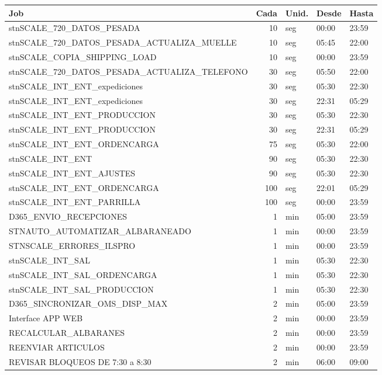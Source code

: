 \documentclass[11pt,a4paper]{article}
\begin{document}
\begin{longtable}{p{8.6cm}rp{1.3cm}p{1.6cm}p{1.6cm}}
\toprule
\textbf{Job} & \textbf{Cada} & \textbf{Unid.} & \textbf{Desde} & \textbf{Hasta} \\
\midrule
\endhead
stnSCALE\_720\_DATOS\_PESADA & 10 & seg & 00:00 & 23:59 \\
stnSCALE\_720\_DATOS\_PESADA\_ACTUALIZA\_MUELLE & 10 & seg & 05:45 & 22:00 \\
stnSCALE\_COPIA\_SHIPPING\_LOAD & 10 & seg & 00:00 & 23:59 \\
stnSCALE\_720\_DATOS\_PESADA\_ACTUALIZA\_TELEFONO & 30 & seg & 05:50 & 22:00 \\
stnSCALE\_INT\_ENT\_expediciones & 30 & seg & 05:30 & 22:30 \\
stnSCALE\_INT\_ENT\_expediciones & 30 & seg & 22:31 & 05:29 \\
stnSCALE\_INT\_ENT\_PRODUCCION & 30 & seg & 05:30 & 22:30 \\
stnSCALE\_INT\_ENT\_PRODUCCION & 30 & seg & 22:31 & 05:29 \\
stnSCALE\_INT\_ENT\_ORDENCARGA & 75 & seg & 05:30 & 22:00 \\
stnSCALE\_INT\_ENT & 90 & seg & 05:30 & 22:30 \\
stnSCALE\_INT\_ENT\_AJUSTES & 90 & seg & 05:30 & 22:30 \\
stnSCALE\_INT\_ENT\_ORDENCARGA & 100 & seg & 22:01 & 05:29 \\
stnSCALE\_INT\_ENT\_PARRILLA & 100 & seg & 00:00 & 23:59 \\
\midrule
D365\_ENVIO\_RECEPCIONES & 1 & min & 05:00 & 23:59 \\
STNAUTO\_AUTOMATIZAR\_ALBARANEADO & 1 & min & 00:00 & 23:59 \\
STNSCALE\_ERRORES\_ILSPRO & 1 & min & 00:00 & 23:59 \\
stnSCALE\_INT\_SAL & 1 & min & 05:30 & 22:30 \\
stnSCALE\_INT\_SAL\_ORDENCARGA & 1 & min & 05:30 & 22:30 \\
stnSCALE\_INT\_SAL\_PRODUCCION & 1 & min & 05:30 & 22:30 \\
D365\_SINCRONIZAR\_OMS\_DISP\_MAX & 2 & min & 05:00 & 23:59 \\
Interface APP WEB & 2 & min & 00:00 & 23:59 \\
RECALCULAR\_ALBARANES & 2 & min & 00:00 & 23:59 \\
REENVIAR ARTICULOS & 2 & min & 00:00 & 23:59 \\
REVISAR BLOQUEOS DE 7:30 a 8:30 & 2 & min & 06:00 & 09:00 \\

\end{longtable}
\end{document}
